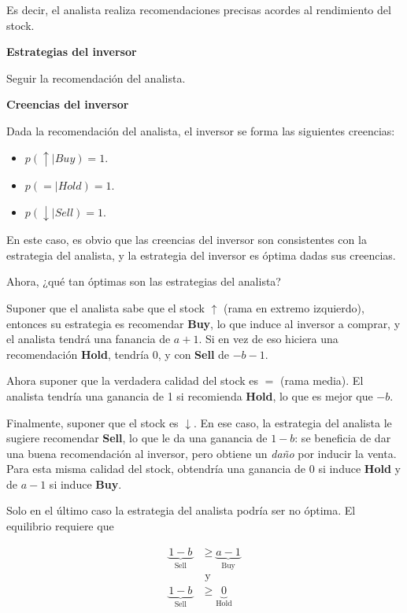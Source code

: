 \documentclass[12pt]{article}
\begin{document}
Es decir, el analista realiza recomendaciones precisas acordes al rendimiento del stock.

\textbf{Estrategias del inversor}

Seguir la recomendación del analista.

\textbf{Creencias del inversor}

Dada la recomendación del analista, el inversor se forma las siguientes creencias:

\begin{itemize}
	\setlength{\itemsep}{0pt}
	\setlength{\parskip}{0pt}
	\setlength{\parsep}{0pt}
	\item $ p(\uparrow | Buy) = 1 $.
	\item $ p(=| Hold) = 1 $.
	\item $ p(\downarrow | Sell) = 1 $.
\end{itemize}

En este caso, es obvio que las creencias del inversor son consistentes con la estrategia del analista, y la estrategia del inversor es óptima dadas sus creencias.

Ahora, ¿qué tan óptimas son las estrategias del analista?

Suponer que el analista sabe que el stock $ \uparrow  $ (rama en extremo izquierdo), entonces su estrategia es recomendar \textbf{Buy}, lo que induce al inversor a comprar, y el analista tendrá una fanancia de $ a+1 $. Si en vez de eso hiciera una recomendación \textbf{Hold}, tendría 0, y con \textbf{Sell} de $ -b-1 $.

Ahora suponer que la verdadera calidad del stock es $ = $ (rama media). El analista tendría una ganancia de 1 si recomienda \textbf{Hold}, lo que es mejor que $ -b $.

Finalmente, suponer que el stock es $ \downarrow  $. En ese caso, la estrategia del analista le sugiere recomendar \textbf{Sell}, lo que le da una ganancia de $ 1-b $: se beneficia de dar una buena recomendación al inversor, pero obtiene un \textit{daño} por inducir la venta. Para esta misma calidad del stock, obtendría una ganancia de 0 si induce \textbf{Hold} y de $ a-1 $ si induce \textbf{Buy}.

Solo en el último caso la estrategia del analista podría ser no óptima. El equilibrio requiere que 

\begin{align*}
	\underbrace{1-b}_{\text{Sell}} &\geq \underbrace{a-1}_{\text{Buy}}\\ &\text{ y }\\
	\underbrace{1-b}_{\text{Sell}} &\geq\underbrace{0}_{\text{Hold}}
\end{align*}
\end{document}
